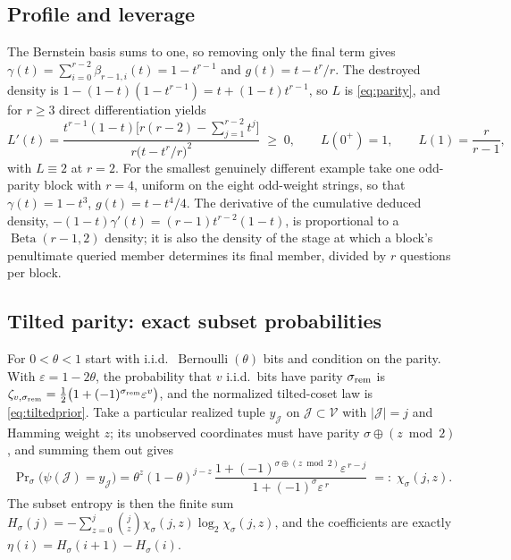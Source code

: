 \subsection{Profile and leverage}

The Bernstein basis sums to one, so removing only the final term
gives $\gamma(t) = \sum_{i=0}^{r-2}\beta_{r-1,i}(t) = 1-t^{r-1}$ and
$g(t) = t-t^r/r$. The destroyed density is
$1-(1-t)(1-t^{r-1}) = t+(1-t)t^{r-1}$, so $L$ is
\eqref{eq:parity}, and for $r\ge3$ direct differentiation yields
%
\begin{equation}
  L'(t)
  = \frac{t^{r-1}(1-t)
    \big[r(r-2)-\sum_{j=1}^{r-2}t^j\big]}
    {r\big(t-t^r/r\big)^2} \;\ge\; 0,
  \qquad
  L(0^+) = 1,
  \qquad
  L(1) = \frac r{r-1},
  \label{eq:apparityLprime}
\end{equation}
%
with $L\equiv2$ at $r = 2$. For the smallest genuinely different
example take one odd-parity block with $r = 4$, uniform on the eight
odd-weight strings, so that $\gamma(t) = 1-t^3$, $g(t) = t-t^4/4$.
The derivative of the cumulative deduced density,
$-(1-t)\gamma'(t) = (r-1)t^{r-2}(1-t)$, is proportional to a
$\operatorname{Beta}(r-1,2)$ density; it is also the density of the
stage at which a block's penultimate queried member determines its
final member, divided by $r$ questions per block.

\subsection{Tilted parity: exact subset probabilities}

For $0<\theta<1$ start with i.i.d.\
$\operatorname{Bernoulli}(\theta)$ bits and condition on the parity.
With $\varepsilon = 1-2\theta$, the probability that $v$ i.i.d.\ bits
have parity $\sigma_{\rm rem}$ is
$\zeta_{v,\sigma_{\rm rem}}
= \tfrac12\big(1+(-1)^{\sigma_{\rm rem}}\varepsilon^v\big)$, and the
normalized tilted-coset law is \eqref{eq:tiltedprior}. Take a
particular realized tuple $y_{\mathcal J}$ on
$\mathcal J\subset\mathcal V$ with $|\mathcal J| = j$ and Hamming
weight $z$; its unobserved coordinates must have parity
$\sigma\oplus(z\bmod2)$, and summing them out gives
%
\begin{equation}
  \Pr\nolimits_\sigma\big(\psi(\mathcal J) = y_{\mathcal J}\big)
  = \theta^z(1-\theta)^{j-z}\,
  \frac{1+(-1)^{\sigma\oplus(z\bmod2)}\varepsilon^{\,r-j}}
       {1+(-1)^\sigma\varepsilon^{\,r}}
  \;=:\; \chi_\sigma(j,z).
  \label{eq:apptiltedsubset}
\end{equation}
%
The subset entropy is then the finite sum
$H_\sigma(j) = -\sum_{z=0}^j\binom jz\chi_\sigma(j,z)
\log_2\chi_\sigma(j,z)$, and the coefficients are exactly
$\eta(i) = H_\sigma(i+1)-H_\sigma(i)$.

